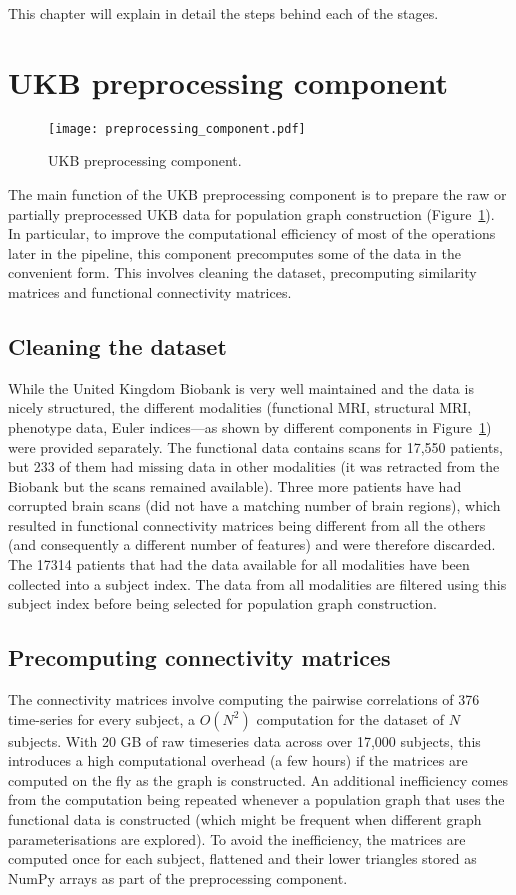 This chapter will explain in detail the steps behind each of the stages.


\section{UKB preprocessing component}

\begin{figure}[h]
    \centering
    \texttt{[image: preprocessing\_component.pdf]}
    \caption{UKB preprocessing component.}\label{preprocessing-component}
\end{figure}

The main function of the UKB preprocessing component is to prepare the raw or partially preprocessed UKB data for population graph construction (Figure~\ref{preprocessing-component}). In particular, to improve the computational efficiency of most of the operations later in the pipeline, this component precomputes some of the data in the convenient form. This involves cleaning the dataset, precomputing similarity matrices and functional connectivity matrices.

\subsection{Cleaning the dataset}
While the United Kingdom Biobank is very well maintained and the data is nicely structured, the different modalities (functional MRI, structural MRI, phenotype data, Euler indices—as shown by different components in Figure~\ref{preprocessing-component}) were provided separately. The functional data contains scans for 17,550 patients, but 233 of them had missing data in other modalities (it was retracted from the Biobank but the scans remained available). Three more patients have had corrupted brain scans (did not have a matching number of brain regions), which resulted in functional connectivity matrices being different from all the others (and consequently a different number of features) and were therefore discarded. The 17314 patients that had the data available for all modalities have been collected into a subject index. The data from all modalities are filtered using this subject index before being selected for population graph construction.

\subsection{Precomputing connectivity matrices}
The connectivity matrices involve computing the pairwise correlations of 376 time-series for every subject, a $O(N^2)$ computation for the dataset of  $N$ subjects. With 20 GB of raw timeseries data across over 17,000 subjects, this introduces a high computational overhead (a few hours) if the matrices are computed on the fly as the graph is constructed. An additional inefficiency comes from the computation being repeated whenever a population graph that uses the functional data is constructed (which might be frequent when different graph parameterisations are explored). To avoid the inefficiency, the matrices are computed once for each subject, flattened and their lower triangles stored as NumPy arrays as part of the preprocessing component.

